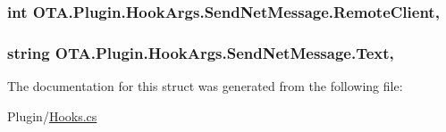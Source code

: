\subsubsection[{Remote\+Client}]{\setlength{\rightskip}{0pt plus 5cm}int O\+T\+A.\+Plugin.\+Hook\+Args.\+Send\+Net\+Message.\+Remote\+Client\hspace{0.3cm}{\ttfamily [get]}, {\ttfamily [set]}}\label{struct_o_t_a_1_1_plugin_1_1_hook_args_1_1_send_net_message_a92225011fe528178d86f4a885ca25d3d}
\hypertarget{struct_o_t_a_1_1_plugin_1_1_hook_args_1_1_send_net_message_a80b3ed7b70c26040098f58e6c332ab44}{}
\subsubsection[{Text}]{\setlength{\rightskip}{0pt plus 5cm}string O\+T\+A.\+Plugin.\+Hook\+Args.\+Send\+Net\+Message.\+Text\hspace{0.3cm}{\ttfamily [get]}, {\ttfamily [set]}}\label{struct_o_t_a_1_1_plugin_1_1_hook_args_1_1_send_net_message_a80b3ed7b70c26040098f58e6c332ab44}


The documentation for this struct was generated from the following file\+:\begin{DoxyCompactItemize}
\item 
Plugin/\hyperlink{_hooks_8cs}{Hooks.\+cs}\end{DoxyCompactItemize}
